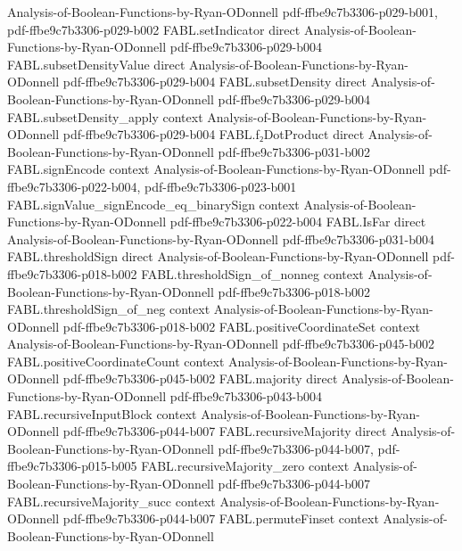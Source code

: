 \begin{theorem}
  {Analysis-of-Boolean-Functions-by-Ryan-ODonnell}
  {pdf-ffbe9c7b3306-p029-b001,
    pdf-ffbe9c7b3306-p029-b002}
\proofstep
  {FABL.setIndicator}
  {direct}
  {Analysis-of-Boolean-Functions-by-Ryan-ODonnell}
  {pdf-ffbe9c7b3306-p029-b004}
\proofstep
  {FABL.subsetDensityValue}
  {direct}
  {Analysis-of-Boolean-Functions-by-Ryan-ODonnell}
  {pdf-ffbe9c7b3306-p029-b004}
\proofstep
  {FABL.subsetDensity}
  {direct}
  {Analysis-of-Boolean-Functions-by-Ryan-ODonnell}
  {pdf-ffbe9c7b3306-p029-b004}
\proofstep
  {FABL.subsetDensity_apply}
  {context}
  {Analysis-of-Boolean-Functions-by-Ryan-ODonnell}
  {pdf-ffbe9c7b3306-p029-b004}
\proofstep
  {FABL.f₂DotProduct}
  {direct}
  {Analysis-of-Boolean-Functions-by-Ryan-ODonnell}
  {pdf-ffbe9c7b3306-p031-b002}
\proofstep
  {FABL.signEncode}
  {context}
  {Analysis-of-Boolean-Functions-by-Ryan-ODonnell}
  {pdf-ffbe9c7b3306-p022-b004,
    pdf-ffbe9c7b3306-p023-b001}
\proofstep
  {FABL.signValue_signEncode_eq_binarySign}
  {context}
  {Analysis-of-Boolean-Functions-by-Ryan-ODonnell}
  {pdf-ffbe9c7b3306-p022-b004}
\proofstep
  {FABL.IsFar}
  {direct}
  {Analysis-of-Boolean-Functions-by-Ryan-ODonnell}
  {pdf-ffbe9c7b3306-p031-b004}
\proofstep
  {FABL.thresholdSign}
  {direct}
  {Analysis-of-Boolean-Functions-by-Ryan-ODonnell}
  {pdf-ffbe9c7b3306-p018-b002}
\proofstep
  {FABL.thresholdSign_of_nonneg}
  {context}
  {Analysis-of-Boolean-Functions-by-Ryan-ODonnell}
  {pdf-ffbe9c7b3306-p018-b002}
\proofstep
  {FABL.thresholdSign_of_neg}
  {context}
  {Analysis-of-Boolean-Functions-by-Ryan-ODonnell}
  {pdf-ffbe9c7b3306-p018-b002}
\proofstep
  {FABL.positiveCoordinateSet}
  {context}
  {Analysis-of-Boolean-Functions-by-Ryan-ODonnell}
  {pdf-ffbe9c7b3306-p045-b002}
\proofstep
  {FABL.positiveCoordinateCount}
  {context}
  {Analysis-of-Boolean-Functions-by-Ryan-ODonnell}
  {pdf-ffbe9c7b3306-p045-b002}
\proofstep
  {FABL.majority}
  {direct}
  {Analysis-of-Boolean-Functions-by-Ryan-ODonnell}
  {pdf-ffbe9c7b3306-p043-b004}
\proofstep
  {FABL.recursiveInputBlock}
  {context}
  {Analysis-of-Boolean-Functions-by-Ryan-ODonnell}
  {pdf-ffbe9c7b3306-p044-b007}
\proofstep
  {FABL.recursiveMajority}
  {direct}
  {Analysis-of-Boolean-Functions-by-Ryan-ODonnell}
  {pdf-ffbe9c7b3306-p044-b007,
    pdf-ffbe9c7b3306-p015-b005}
\proofstep
  {FABL.recursiveMajority_zero}
  {context}
  {Analysis-of-Boolean-Functions-by-Ryan-ODonnell}
  {pdf-ffbe9c7b3306-p044-b007}
\proofstep
  {FABL.recursiveMajority_succ}
  {context}
  {Analysis-of-Boolean-Functions-by-Ryan-ODonnell}
  {pdf-ffbe9c7b3306-p044-b007}
\proofstep
  {FABL.permuteFinset}
  {context}
  {Analysis-of-Boolean-Functions-by-Ryan-ODonnell}

\end{theorem}
